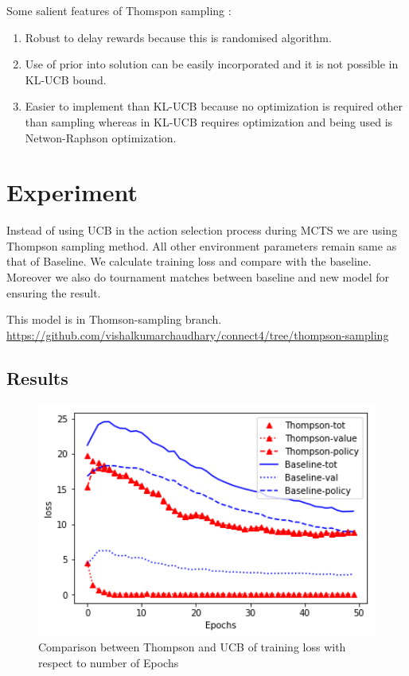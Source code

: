 Some salient features of Thomspon sampling :
\begin{enumerate}
\item  Robust to delay rewards because this is randomised algorithm.
\item  Use of prior into solution can be easily incorporated and it is not possible in KL-UCB bound.
\item  Easier to implement than KL-UCB because no optimization is required other than sampling whereas in KL-UCB requires optimization and being used is Netwon-Raphson optimization.
\end{enumerate}

\section{Experiment}
Instead of using UCB in the action selection process during MCTS we are using Thompson sampling method. All other environment parameters remain same as that of Baseline. We calculate training loss and compare with the baseline. Moreover we also do tournament matches between baseline and new model for ensuring the result.

This model is in Thomson-sampling branch.
\url{https://github.com/vishalkumarchaudhary/connect4/tree/thompson-sampling}

\subsection{Results}
\begin{figure}
 	[htb]\centering
    \includegraphics[width=6in]{images/thompsonVSbaseline.png}
    \caption{Comparison between Thompson and  UCB of training loss with respect to number of Epochs }
  \label{fig:phase}
\end{figure}


